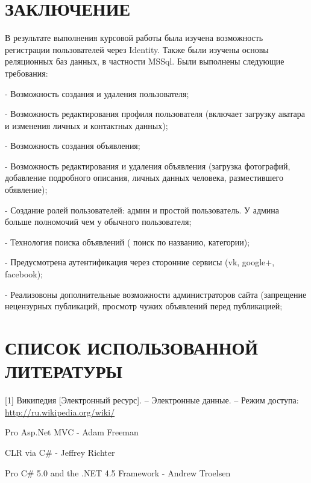 \documentclass[14pt,a4paper]{extreport}
\begin{document}
	\newpage
	\section*{\center\normalsize ЗАКЛЮЧЕНИЕ \endcenter}


	\parindent=1cm В результате выполнения курсовой работы была изучена возможность регистрации пользователей через Identity. Также были изучены основы реляционных баз данных, в частности MSSql. Были выполнены следующие требования:\par
	- Возможность создания и удаления пользователя;\par
	- Возможность редактирования профиля пользователя (включает загрузку аватара и изменения личных и контактных данных);\par
	- Возможность создания объявления;\par
	- Возможность редактирования и удаления объявления (загрузка фотографий, добавление подробного описания, личных данных человека, разместившего обявление);\par
	- Создание ролей пользователей: админ и простой пользователь. У админа больше полномочий чем у обычного пользователя;\par
	- Технология поиска объявлений ( поиск по названию, категории);\par
	- Предусмотрена аутентификация через сторонние сервисы (vk, google+, facebook);\par
	- Реализовоны дополнительные возможности администраторов сайта (запрещение нецензурных публикаций, просмотр чужих объявлений перед публикацией;\par 

	\newpage
	\section*{\center\normalsize СПИСОК ИСПОЛЬЗОВАННОЙ ЛИТЕРАТУРЫ \endcenter}

	\parindent=1cm[1] Википедия [Электронный ресурс]. – Электронные данные. – Режим доступа:						\href{http://ru.wikipedia.org/wiki/}{http://ru.wikipedia.org/wiki/}\par
	[2] Pro Asp.Net MVC - Adam Freeman\par
	[3] CLR via C\# - Jeffrey Richter\par
	[4] Pro C\# 5.0 and the .NET 4.5 Framework - Andrew Troelsen\par
\end{document}
